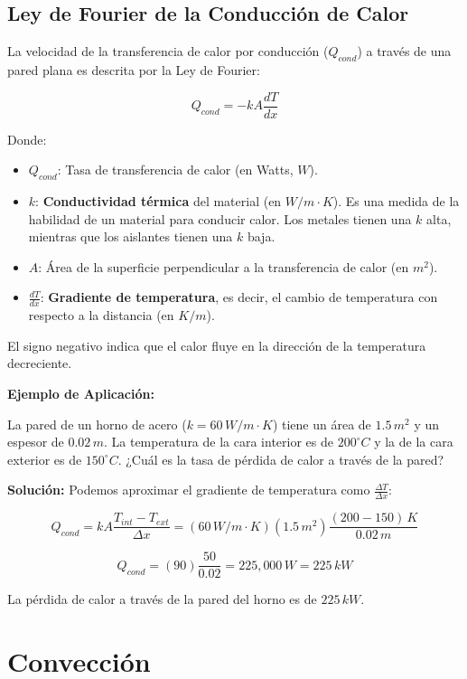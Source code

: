 \documentclass{article}
\begin{document}
\subsection*{Ley de Fourier de la Conducción de Calor}

La velocidad de la transferencia de calor por conducción ($Q_{cond}$) a través de una pared plana es descrita por la Ley de Fourier:

$$ Q_{cond} = -k A \frac{dT}{dx} $$

Donde:
\begin{itemize}
    \item $Q_{cond}$: Tasa de transferencia de calor (en Watts, $W$).
    \item $k$: \textbf{Conductividad térmica} del material (en $W/m \cdot K$). Es una medida de la habilidad de un material para conducir calor. Los metales tienen una $k$ alta, mientras que los aislantes tienen una $k$ baja.
    \item $A$: Área de la superficie perpendicular a la transferencia de calor (en $m^2$).
    \item $\frac{dT}{dx}$: \textbf{Gradiente de temperatura}, es decir, el cambio de temperatura con respecto a la distancia (en $K/m$).
\end{itemize}

El signo negativo indica que el calor fluye en la dirección de la temperatura decreciente.

\textbf{Ejemplo de Aplicación:}

La pared de un horno de acero ($k = 60 \, W/m \cdot K$) tiene un área de $1.5 \, m^2$ y un espesor de $0.02 \, m$. La temperatura de la cara interior es de $200^\circ C$ y la de la cara exterior es de $150^\circ C$. ¿Cuál es la tasa de pérdida de calor a través de la pared?

\textbf{Solución:}
Podemos aproximar el gradiente de temperatura como $\frac{\Delta T}{\Delta x}$:

$$ Q_{cond} = k A \frac{T_{int} - T_{ext}}{\Delta x} = (60 \, W/m \cdot K)(1.5 \, m^2) \frac{(200 - 150) \, K}{0.02 \, m} $$

$$ Q_{cond} = (90) \frac{50}{0.02} = 225,000 \, W = 225 \, kW $$

La pérdida de calor a través de la pared del horno es de $225 \, kW$.

\section*{Convección}
\end{document}
